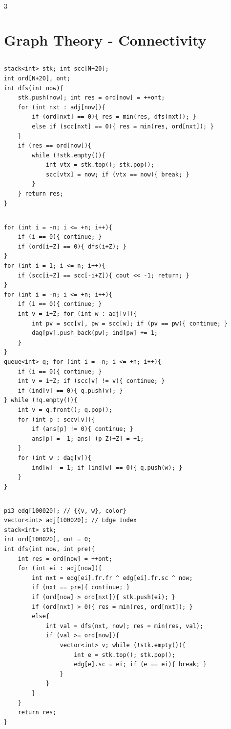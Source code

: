 \documentclass[landscape, 8pt, a4paper, oneside]{extarticle}
\begin{document}
\begin{multicols*}{3}
\section{Graph Theory - Connectivity}
\subsection{}
\begin{verbatim}
stack<int> stk; int scc[N+20];
int ord[N+20], ont;
int dfs(int now){
	stk.push(now); int res = ord[now] = ++ont;
	for (int nxt : adj[now]){
		if (ord[nxt] == 0){ res = min(res, dfs(nxt)); }
		else if (scc[nxt] == 0){ res = min(res, ord[nxt]); }
	}
	if (res == ord[now]){
		while (!stk.empty()){
			int vtx = stk.top(); stk.pop();
			scc[vtx] = now; if (vtx == now){ break; }
		}
	} return res;
}
\end{verbatim}
\subsection{}
\begin{verbatim}
for (int i = -n; i <= +n; i++){
	if (i == 0){ continue; }
	if (ord[i+Z] == 0){ dfs(i+Z); }
}
for (int i = 1; i <= n; i++){
	if (scc[i+Z] == scc[-i+Z]){ cout << -1; return; }
}
for (int i = -n; i <= +n; i++){
	if (i == 0){ continue; }
	int v = i+Z; for (int w : adj[v]){
		int pv = scc[v], pw = scc[w]; if (pv == pw){ continue; }
		dag[pv].push_back(pw); ind[pw] += 1;
	}
}
queue<int> q; for (int i = -n; i <= +n; i++){
	if (i == 0){ continue; }
	int v = i+Z; if (scc[v] != v){ continue; }
	if (ind[v] == 0){ q.push(v); }
} while (!q.empty()){
	int v = q.front(); q.pop();
	for (int p : sccv[v]){
		if (ans[p] != 0){ continue; }
		ans[p] = -1; ans[-(p-Z)+Z] = +1;
	}
	for (int w : dag[v]){
		ind[w] -= 1; if (ind[w] == 0){ q.push(w); }
	}
}
\end{verbatim}
\subsection{}
\begin{verbatim}
pi3 edg[100020]; // {{v, w}, color}
vector<int> adj[100020]; // Edge Index
stack<int> stk;
int ord[100020], ont = 0;
int dfs(int now, int pre){
	int res = ord[now] = ++ont;
	for (int ei : adj[now]){
		int nxt = edg[ei].fr.fr ^ edg[ei].fr.sc ^ now;
		if (nxt == pre){ continue; }
		if (ord[now] > ord[nxt]){ stk.push(ei); }
		if (ord[nxt] > 0){ res = min(res, ord[nxt]); }
		else{
			int val = dfs(nxt, now); res = min(res, val);
			if (val >= ord[now]){
				vector<int> v; while (!stk.empty()){
					int e = stk.top(); stk.pop();
					edg[e].sc = ei; if (e == ei){ break; }
				}
			}
		}
	}
	return res;
}
\end{verbatim}

\end{multicols*}
\end{document}
